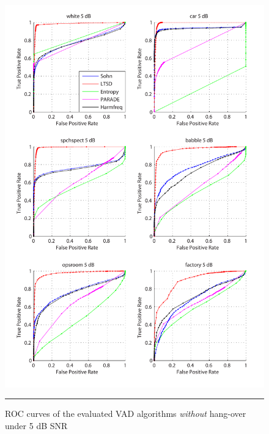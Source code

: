 \begin{figure}[htbp]
	\centering
		\includegraphics[width=1.0\columnwidth]{Figures/AppendixA/5dBnoh.pdf}
		\rule{37em}{0.5pt}
	\caption[ROC curves of the evaluated algorithms \emph{without} hang-over under 5 dB SNR]{ROC curves of the evaluated VAD algorithms \emph{without} hang-over under 5 dB SNR}
	\label{fig:5dBnoh}
\end{figure}

